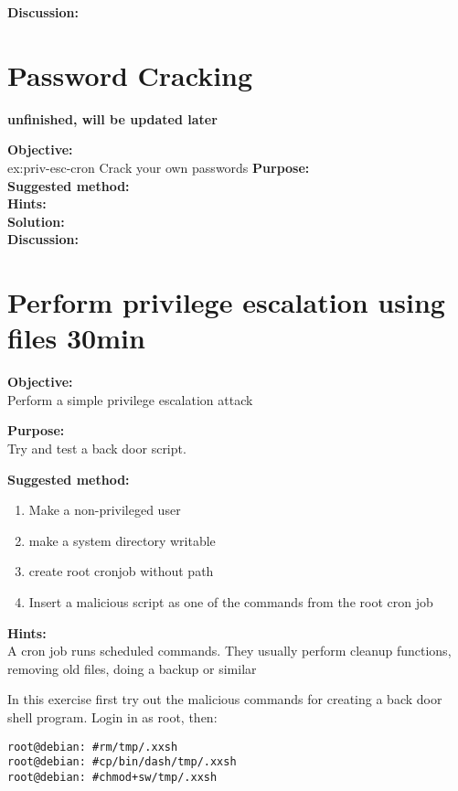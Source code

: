 \documentclass[a4paper,11pt,notitlepage]{report}
\begin{document}
{\bf Discussion:}\\


\chapter{Password Cracking}
\label{ex:pwcrack-101}

{\bf unfinished, will be updated later}

{\bf Objective:}\\
{ex:priv-esc-cron}
Crack your own passwords
{\bf Purpose:}\\


{\bf Suggested method:}\\


{\bf Hints:}\\


{\bf Solution:}\\


{\bf Discussion:}\\


\chapter{Perform privilege escalation using files 30min}
\label{ex:priv-esc-cron}

{\bf Objective:}\\
Perform a simple privilege escalation attack

{\bf Purpose:}\\
Try and test a back door script.

{\bf Suggested method:}\\

\begin{enumerate}
\item Make a non-privileged user
\item make a system directory writable
\item create root cronjob without path
\item Insert a malicious script as one of the commands from the root cron job
\end{enumerate}

{\bf Hints:}\\
A cron job runs scheduled commands. They usually perform cleanup functions, removing old files, doing a backup or similar

In this exercise first try out the malicious commands for creating a back door shell program. Login in as root, then:

\begin{alltt}
root@debian:~# rm /tmp/.xxsh
root@debian:~# cp /bin/dash /tmp/.xxsh
root@debian:~# chmod +sw /tmp/.xxsh
\end{alltt}
\end{document}
